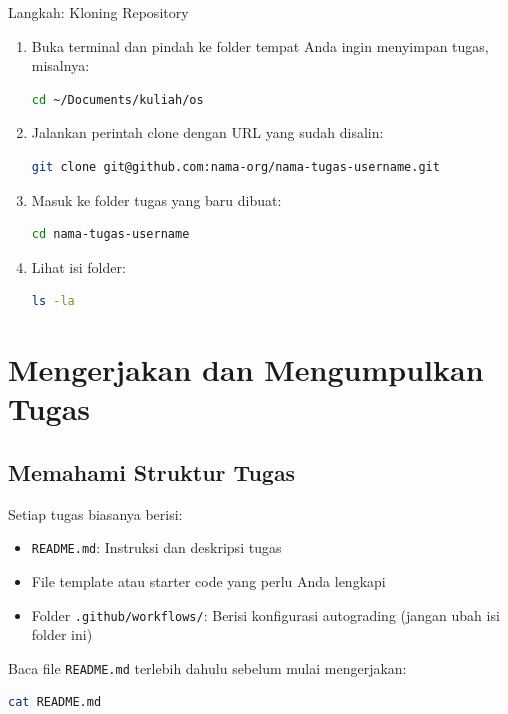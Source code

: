 \documentclass[
    a4paper,
    11pt,
    parskip=half
]{scrartcl}
\begin{document}
\begin{stepbox}{Langkah: Kloning Repository}
\begin{enumerate}
    \item Buka terminal dan pindah ke folder tempat Anda ingin menyimpan tugas, misalnya:
\begin{lstlisting}[language=bash]
cd ~/Documents/kuliah/os
\end{lstlisting}
    \item Jalankan perintah clone dengan URL yang sudah disalin:
\begin{lstlisting}[language=bash]
git clone git@github.com:nama-org/nama-tugas-username.git
\end{lstlisting}
    \item Masuk ke folder tugas yang baru dibuat:
\begin{lstlisting}[language=bash]
cd nama-tugas-username
\end{lstlisting}
    \item Lihat isi folder:
\begin{lstlisting}[language=bash]
ls -la
\end{lstlisting}
\end{enumerate}
\end{stepbox}

\section{Mengerjakan dan Mengumpulkan Tugas}
\label{sec:submit}

\subsection{Memahami Struktur Tugas}

Setiap tugas biasanya berisi:
\begin{itemize}
    \item \texttt{README.md}: Instruksi dan deskripsi tugas
    \item File template atau starter code yang perlu Anda lengkapi
    \item Folder \texttt{.github/workflows/}: Berisi konfigurasi autograding (jangan ubah isi folder ini)
\end{itemize}

Baca file \texttt{README.md} terlebih dahulu sebelum mulai mengerjakan:
\begin{lstlisting}[language=bash]
cat README.md
\end{lstlisting}
\end{document}
